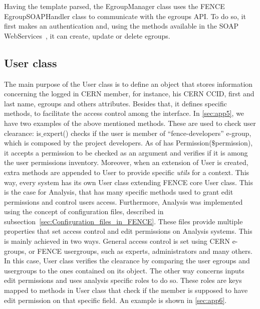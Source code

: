 Having the template parsed, the EgroupManager class uses the FENCE EgroupSOAPHandler class to communicate with the egroups API. To do so, it first makes an authentication and, using the methods available in the SOAP WebServices~\cite{egroups}, it can create, update or delete egroups.

\subsection{User class}
\label{sec:User_class}

The main purpose of the User class is to define an object that stores information concerning the logged in CERN member, for instance, his CERN CCID, first and last name, egroups and others attributes. Besides that, it defines specific methods, to facilitate the access control among the interface. 
In \ref{sec:app5}, we have two examples of the above mentioned methods. These are used to check user clearance: is$\_$expert() checks if the user is member of “fence-developers” e-group, which is composed by the project developers. As of has Permission($\$$permission), it accepts a permission to be checked as an argument and verifies if it is among the user permissions inventory.
Moreover, when an extension of User is created, extra methods are appended to User to provide specific \textit{utils} for a context. This way, every system has its own User class extending FENCE core User class. This is the case for Analysis, that has many specific methods used to grant edit permissions and control users access.
Furthermore, Analysis was implemented using the concept of configuration files, described in subsection~\ref{sec:Configuration_files_in_FENCE}. These files provide multiple properties that set access control and edit permissions on Analysis systems. This is mainly achieved in two ways. General access control is set using CERN e-groups, or FENCE usergroups, such as experts, administrators and many others. In this case, User class verifies the clearance by comparing the user egroups and usergroups to the ones contained on its object. The other way concerns inputs edit permissions and uses analysis specific roles to do so. These roles are keys mapped to methods in User class that check if the member is supposed to have edit permission on that specific field. An example is shown in \ref{sec:app6}.

